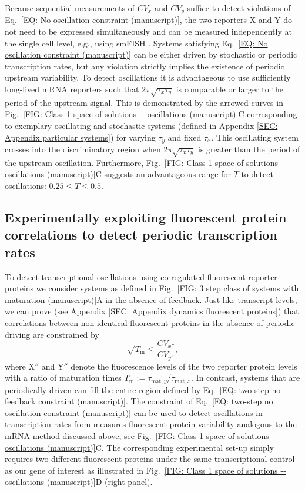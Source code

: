\documentclass[%
 reprint,prx,
superscriptaddress,
%
%
%
%
%
%
%
%
%
 amsmath,amssymb,
 aps,
%
%
%
%
%
%
]{revtex4-2}
\newlength{\arrow}
\begin{document}
Because sequential measurements of $CV_x$ and $CV_y$ suffice to detect violations of Eq.~\eqref{EQ: No oscillation constraint (manuscript)}, the two reporters X and Y do not need to be expressed simultaneously and can be measured independently at the single cell level, e.g., using smFISH \cite{Raj2013}.
%
Systems satisfying Eq.~\eqref{EQ: No oscillation constraint (manuscript)} can be either driven by stochastic or periodic transcription rates, but any violation strictly implies the existence of periodic upstream variability. To detect oscillations it is advantageous to use sufficiently long-lived mRNA reporters such that $2\pi\sqrt{\tau_{x}\tau_{y}}$ 
%
is comparable {or larger} to the period of the upstream signal. { This is demonstrated by the arrowed curves in Fig.~\ref{FIG: Class 1 space of solutions -- oscillations (manuscript)}C corresponding to exemplary oscillating and stochastic systems (defined in Appendix \ref{SEC: Appendix particular systems}) for varying $\tau_{y}$ and fixed $\tau_{x}$. This oscillating system crosses into the discriminatory region when $2\pi \sqrt{\tau_{x}\tau_{y}}$ is greater than the period of the upstream oscillation. Furthermore, Fig.~\ref{FIG: Class 1 space of solutions -- oscillations (manuscript)}C suggests an advantageous range for $T$ to detect oscillations:  $0.25 \leq T \leq 0.5$.} 
%

\subsection{Experimentally exploiting fluorescent protein correlations to detect periodic transcription rates}
\vspace{-.75em}
To detect transcriptional oscillations using co-regulated fluorescent reporter proteins we consider systems as defined in Fig.~\ref{FIG: 3 step class of systems with maturation (manuscript)}A in the absence of feedback. Just like transcript levels, we can prove (see Appendix \ref{SEC: Appendix dynamics fluorescent proteins}) 
%
that correlations between non-identical fluorescent proteins in the absence of periodic driving are constrained by
\begin{equation}
\sqrt{T_\mathrm{m}} \leqslant \frac{CV_{x''}}{CV_{y''}} ,
\label{EQ: two-step no oscillation constraint (manuscript)}
\end{equation}
where X$''$ and Y$''$ denote the fluorescence levels of the two reporter protein levels with a ratio of maturation times $T_\mathrm{m} := \tau_{\mathrm{mat},y} / \tau_{\mathrm{mat},x}$. In contrast, systems that are periodically driven can fill the entire region defined by Eq.~\eqref{EQ: two-step no-feedback constraint (manuscript)}. The constraint of Eq.~\eqref{EQ: two-step no oscillation constraint (manuscript)} can be used to detect oscillations in transcription rates from measures fluorescent protein variability analogous to the mRNA method discussed above, see Fig.~\ref{FIG: Class 1 space of solutions -- oscillations (manuscript)}C. The corresponding experimental set-up simply requires two different fluorescent proteins under the same transcriptional control as our gene of interest as illustrated in Fig.~\ref{FIG: Class 1 space of solutions -- oscillations (manuscript)}D (right panel).
%
\end{document}
